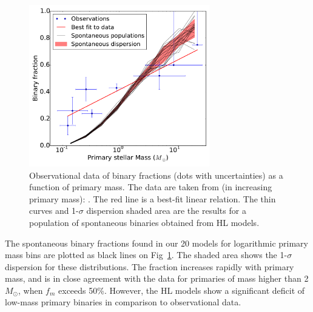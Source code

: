 \begin{figure}
\begin{center}
\includegraphics[width=0.7\textwidth]{Figures/5_spontaneous_primarymass}
\caption{Observational data of binary fractions (dots with uncertainties) as a function of primary mass. The data are taken from (in increasing primary mass): \protect\cite{Close2003,Basri2006,Fischer1992,Ward-Duong2015,Raghavan2010,Patience2002,Preibisch1999,Mason1998}. The red line is a  best-fit linear relation. The thin curves and 1-$\sigma$ dispersion shaded area are the results for a population of  spontaneous binaries obtained from HL  models.}
\label{Fig:5_spontaneous_primarymass}
\end{center}
\end{figure}




The spontaneous binary fractions found in our 20 \HubLem models for logarithmic primary mass bins are plotted as black lines on Fig~\ref{Fig:5_spontaneous_primarymass}. The shaded area shows the 1-$\sigma$ dispersion for these distributions. The fraction increases rapidly  with primary mass,  and is in close agreement with the data for primaries of mass higher than 2 $M_\odot$, when $f_m$ exceeds 50\%.  However, the HL  models show  a significant deficit of low-mass primary binaries in comparison to observational data.  

